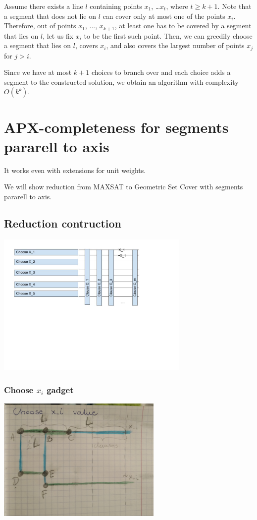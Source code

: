 \documentclass[en]{pracamgr}
\begin{document}
Assume there exists a line $l$ containing points $x_1$, \ldots $x_t$,
where $t \geq k + 1$.
Note that a segment that does not lie on $l$ can cover only at most one
of the points $x_i$.
Therefore, out of points $x_1$, ..., $x_{k+1}$,
at least one has to be covered by a segment that lies on $l$,
let us fix $x_i$ to be the first such point.
Then, we can greedily choose a segment that lies on $l$,
covers $x_i$,
and also covers the largest number of points $x_j$ for $j > i$.

Since we have at most $k + 1$ choices to branch over
and each choice adds a segment to the constructed solution,
we obtain an algorithm with complexity $O(k^k)$.

\section{APX-completeness for segments pararell to axis}
It works even with extensions for unit weights.

We will show reduction from MAXSAT
to Geometric Set Cover with segments pararell to axis.

\subsection{Reduction contruction}

\includegraphics[width=0.7\textwidth]{segment_apx_sketch.jpg}

\subsubsection{Choose $x_i$ gadget}
\includegraphics[width=0.6\textwidth]{choose_x_gadget.jpg}
\end{document}
